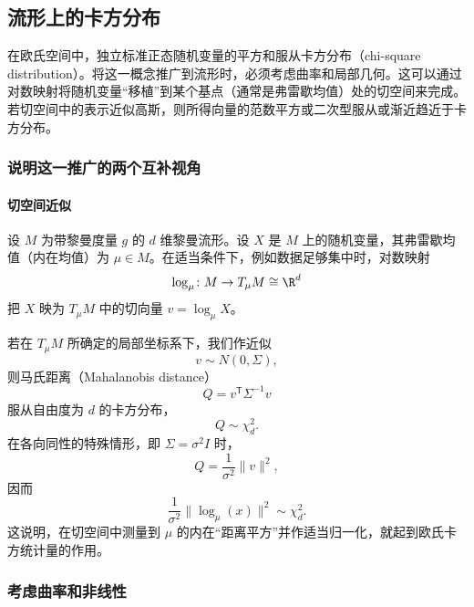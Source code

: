 \subsection{流形上的卡方分布}

在欧氏空间中，独立标准正态随机变量的平方和服从卡方分布（chi-square distribution）。将这一概念推广到流形时，必须考虑曲率和局部几何。这可以通过对数映射将随机变量“移植”到某个基点（通常是弗雷歇均值）处的切空间来完成。若切空间中的表示近似高斯，则所得向量的范数平方或二次型服从或渐近趋近于卡方分布。

\subsubsection{说明这一推广的两个互补视角}

\paragraph{切空间近似}

设 $M$ 为带黎曼度量 $g$ 的 $d$ 维黎曼流形。设 $X$ 是 $M$ 上的随机变量，其弗雷歇均值（内在均值）为 $\mu\in M$。在适当条件下，例如数据足够集中时，对数映射
\[
  \log_\mu\colon M\to T_\mu M\cong\R^d
\]
把 $X$ 映为 $T_\mu M$ 中的切向量 $v=\log_\mu X$。

若在 $T_\mu M$ 所确定的局部坐标系下，我们作近似
\[
  v\sim N(0,\Sigma),
\]
则马氏距离（Mahalanobis distance）
\begin{equation*}
  Q=v^{\mathsf T}\Sigma^{-1}v
  \tag{6.28}\label{eq:6.28}
\end{equation*}
服从自由度为 $d$ 的卡方分布，
\begin{equation*}
  Q\sim\chi_d^2.
  \tag{6.29}\label{eq:6.29}
\end{equation*}
在各向同性的特殊情形，即 $\Sigma=\sigma^2 I$ 时，
\begin{equation*}
  Q=\frac{1}{\sigma^2}\lVert v\rVert^2,
  \tag{6.30}\label{eq:6.30}
\end{equation*}
因而
\begin{equation*}
  \frac{1}{\sigma^2}\lVert\log_\mu(x)\rVert^2\sim\chi_d^2.
  \tag{6.31}\label{eq:6.31}
\end{equation*}
这说明，在切空间中测量到 $\mu$ 的内在“距离平方”并作适当归一化，就起到欧氏卡方统计量的作用。

\subsubsection{考虑曲率和非线性}

